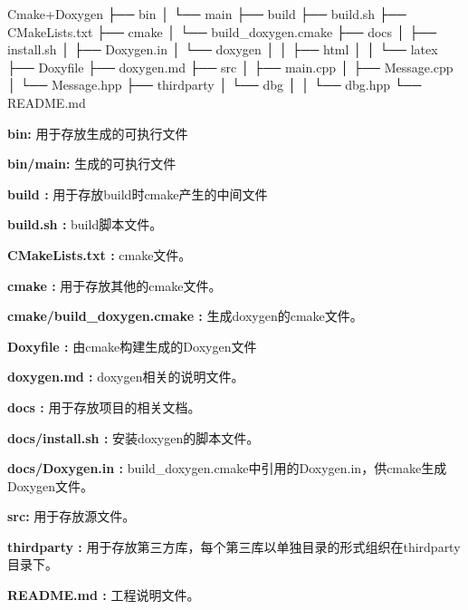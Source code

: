 
\begin{DoxyCode}
Cmake+Doxygen
├── bin
│   └── main
├── build
├── build.sh
├── CMakeLists.txt
├── cmake
│   └── build\_doxygen.cmake
├── docs
│   ├── install.sh
│   ├── Doxygen.in
│   └── doxygen
│   │   ├── html
│   │   └── latex
├── Doxyfile
├── doxygen.md
├── src
│   ├── main.cpp
│   ├── Message.cpp
│   └── Message.hpp
├── thirdparty
│   └── dbg
│   │   └── dbg.hpp
└── README.md
\end{DoxyCode}



\begin{DoxyItemize}
\item {\bfseries bin\+:} 用于存放生成的可执行文件
\item {\bfseries bin/main\+:} 生成的可执行文件
\item {\bfseries build \+:} 用于存放build时cmake产生的中间文件
\item {\bfseries build.\+sh \+:} build脚本文件。
\item {\bfseries C\+Make\+Lists.\+txt \+:} cmake文件。
\item {\bfseries cmake \+:} 用于存放其他的cmake文件。
\item {\bfseries cmake/build\+\_\+doxygen.\+cmake \+:} 生成doxygen的cmake文件。
\item {\bfseries Doxyfile \+:} 由cmake构建生成的\+Doxygen文件
\item {\bfseries doxygen.\+md \+:} doxygen相关的说明文件。
\item {\bfseries docs \+:} 用于存放项目的相关文档。
\item {\bfseries docs/install.\+sh \+:} 安装doxygen的脚本文件。
\item {\bfseries docs/\+Doxygen.\+in \+:} build\+\_\+doxygen.\+cmake中引用的\+Doxygen.\+in，供cmake生成\+Doxygen文件。
\item {\bfseries src\+:} 用于存放源文件。
\item {\bfseries thirdparty \+:} 用于存放第三方库，每个第三库以单独目录的形式组织在thirdparty 目录下。
\item {\bfseries R\+E\+A\+D\+M\+E.\+md \+:} 工程说明文件。 
\end{DoxyItemize}